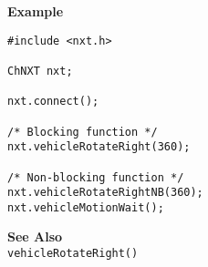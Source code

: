 \noindent
{\bf Example}
\begin{verbatim}
#include <nxt.h>

ChNXT nxt;

nxt.connect();

/* Blocking function */
nxt.vehicleRotateRight(360);

/* Non-blocking function */
nxt.vehicleRotateRightNB(360);
nxt.vehicleMotionWait();
\end{verbatim}

\noindent
{\bf See Also}\\
\texttt{vehicleRotateRight()}

